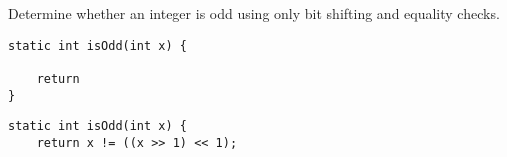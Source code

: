 \question Determine whether an integer is odd using only bit shifting and equality checks.

\ifprintanswers\else
\begin{lstlisting}
static int isOdd(int x) {

    return
}
\end{lstlisting}
\fi

\begin{solution}
\begin{lstlisting}
static int isOdd(int x) {
    return x != ((x >> 1) << 1);
\end{lstlisting}
\end{solution}